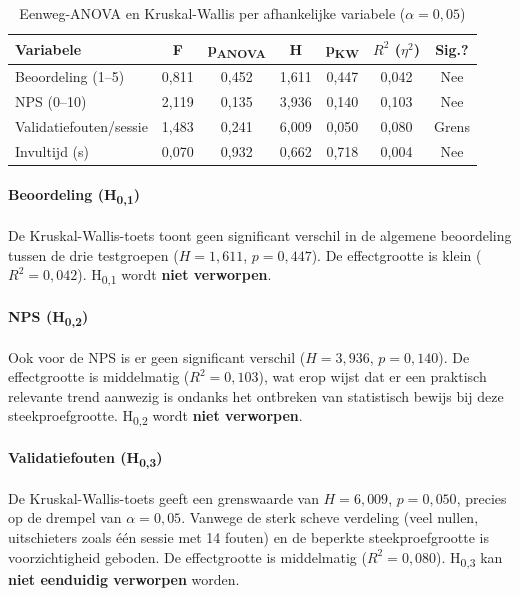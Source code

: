 \begin{table}[h]
  \centering
  \caption[Toetsresultaten per afhankelijke variabele]{Eenweg-ANOVA en Kruskal-Wallis per afhankelijke variabele ($\alpha = 0{,}05$)}
  \label{tab:toetsresultaten}
  \begin{tabular}{lcccccc}
    \hline
    \textbf{Variabele} & \textbf{F} & \textbf{p\textsubscript{ANOVA}} & \textbf{H} & \textbf{p\textsubscript{KW}} & \textbf{$R^2$ ($\eta^2$)} & \textbf{Sig.?} \\
    \hline
    Beoordeling (1–5)      & 0,811 & 0,452 & 1,611 & 0,447 & 0,042 & Nee \\
    NPS (0–10)             & 2,119 & 0,135 & 3,936 & 0,140 & 0,103 & Nee \\
    Validatiefouten/sessie & 1,483 & 0,241 & 6,009 & 0,050 & 0,080 & Grens \\
    Invultijd (s)          & 0,070 & 0,932 & 0,662 & 0,718 & 0,004 & Nee \\
    \hline
  \end{tabular}
\end{table}

\paragraph{Beoordeling (H\textsubscript{0,1})}
De Kruskal-Wallis-toets toont geen significant verschil in de algemene beoordeling tussen de drie testgroepen ($H = 1{,}611$, $p = 0{,}447$). De effectgrootte is klein ($R^2 = 0{,}042$). H\textsubscript{0,1} wordt \textbf{niet verworpen}.

\paragraph{NPS (H\textsubscript{0,2})}
Ook voor de NPS is er geen significant verschil ($H = 3{,}936$, $p = 0{,}140$). De effectgrootte is middelmatig ($R^2 = 0{,}103$), wat erop wijst dat er een praktisch relevante trend aanwezig is ondanks het ontbreken van statistisch bewijs bij deze steekproefgrootte. H\textsubscript{0,2} wordt \textbf{niet verworpen}.

\paragraph{Validatiefouten (H\textsubscript{0,3})}
De Kruskal-Wallis-toets geeft een grenswaarde van $H = 6{,}009$, $p = 0{,}050$, precies op de drempel van $\alpha = 0{,}05$. Vanwege de sterk scheve verdeling (veel nullen, uitschieters zoals één sessie met 14 fouten) en de beperkte steekproefgrootte is voorzichtigheid geboden. De effectgrootte is middelmatig ($R^2 = 0{,}080$). H\textsubscript{0,3} kan \textbf{niet eenduidig verworpen} worden.

